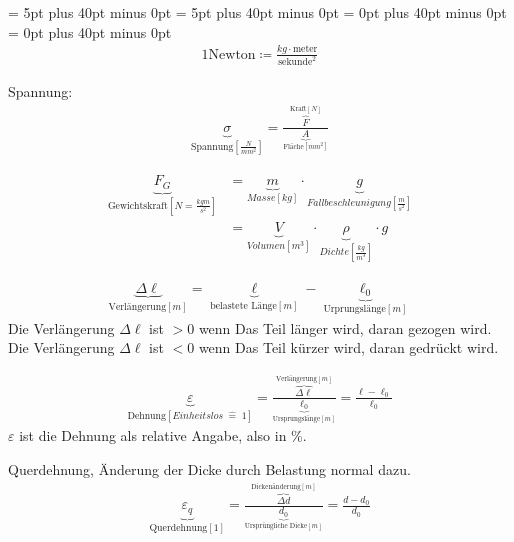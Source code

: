 \documentclass[11pt]{article}
\newcommand{\1}{ {\mathds{1}} }
\begin{document}
    \abovedisplayskip = 5pt plus 40pt minus 0pt
    \belowdisplayskip = 5pt plus 40pt minus 0pt
    \abovedisplayshortskip = 0pt plus 40pt minus 0pt
    \belowdisplayshortskip = 0pt plus 40pt minus 0pt
    \pagestyle{fancy}
    \begin{align*}
        1 \text{Newton} \coloneqq \frac{kg \cdot \text{meter}}{\text{sekunde}^2}
    \end{align*}

    \hrulefill
    
    Spannung:
    \begin{align*}
        \underbrace{\sigma}_{\text{Spannung}\left[\frac{N}{mm^2}\right]}
        =
        \frac{\overbrace{F}^{\text{Kraft}\left[N\right]}}{\underbrace{A}_{\text{Fläche}\left[mm^2\right]}}
    \end{align*}

    \hrulefill
    \begin{align*}
        \underbrace{F_G}_{\text{Gewichtskraft} [N = \frac{kg m}{s^2}]} &= \underbrace{m}_{Masse\left[kg\right]} \cdot \underbrace{g}_{Fallbeschleunigung \left[\frac{m}{s^2}\right]} \\ 
        &= \underbrace{V}_{Volumen\left[m^3\right]} \cdot \underbrace{\rho}_{Dichte\left[\frac{kg}{m^3}\right]} \cdot g
    \end{align*}
    
    \hrulefill
    \begin{align*}
        \underbrace{\Delta \ell}_{\text{Verlängerung}\left[m\right]} = \underbrace{\ell}_{\text{belastete Länge} \left[m\right]} - \underbrace{\ell_0}_{\text{Urprungslänge} \left[m\right]}
    \end{align*}
    Die Verlängerung $\Delta \ell$ ist $>0$ wenn Das Teil länger wird, daran gezogen wird.\\
    Die Verlängerung $\Delta \ell$ ist $<0$ wenn Das Teil kürzer wird, daran gedrückt wird.

    \hrulefill
    \begin{align*}
        \underbrace{\varepsilon}_{\text{Dehnung} \left[Einheitslos \; \widehat{=}\; 1\right]} 
        =
        \frac{\overbrace{\Delta \ell}^{\text{Verlängerung}\left[m\right]}}{\underbrace{\ell_0}_{\text{Ursprungslänge}\left[m\right]}}
        = \frac{\ell - \ell_0}{\ell_0}
    \end{align*}
    $\varepsilon$ ist die Dehnung als relative Angabe, also in \%.

    \hrulefill
    
    Querdehnung, Änderung der Dicke durch Belastung normal dazu.
    \begin{align*}
        \underbrace{\varepsilon_q}_{\text{Querdehnung} \left[1\right]} 
        =
        \frac{\overbrace{\Delta d}^{\text{Dickenänderung}\left[m\right]}}{\underbrace{d_0}_{\text{Ursprüngliche Dicke} \left[m\right]}}
        = \frac{d - d_0}{d_0}
    \end{align*}    
\end{document}
